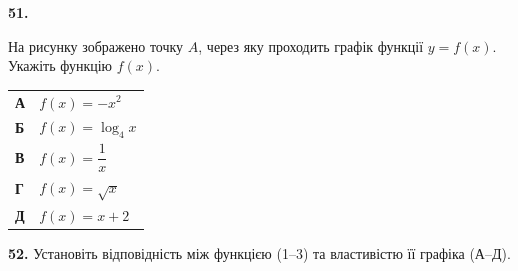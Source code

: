 \documentclass[14pt]{extarticle}
\begin{document}
\noindent\textbf{51.} \begin{minipage}[t]{0.55\textwidth}
На рисунку зображено точку $A$, через яку проходить графік функції $y=f(x)$. Укажіть функцію $f(x)$.
\end{minipage}
\hfill
\begin{minipage}[t]{0.4\textwidth}
    \vspace{-0.5cm}
    \begin{flushright}
    \end{flushright}
\end{minipage}

\vspace{0.3cm}
\begin{tabular}{ll}
    \textbf{А} & $f(x) = -x^2$ \\[0.2cm]
    \textbf{Б} & $f(x) = \log_4 x$ \\[0.2cm]
    \textbf{В} & $f(x) = \dfrac{1}{x}$ \\[0.2cm]
    \textbf{Г} & $f(x) = \sqrt{x}$ \\[0.2cm]
    \textbf{Д} & $f(x) = x+2$ \\
\end{tabular}

\vspace{0.7cm}

\noindent\textbf{52.} Установіть відповідність між функцією (1--3) та властивістю її графіка (А--Д).

\vspace{0.3cm}
\end{document}
